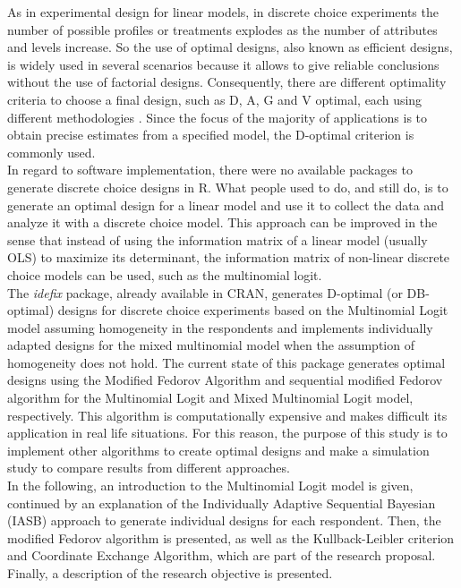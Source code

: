 \documentclass[12pt,a4paper,oneside]{article}
\begin{document}
\noindent As in experimental design for linear models, in discrete choice experiments the number of possible profiles or treatments explodes as the number of attributes and levels increase. So the use of optimal designs, also known as efficient designs, is widely used in several scenarios because it allows to give reliable conclusions without the use of factorial designs. Consequently, there are different optimality criteria to choose a final design, such as D, A, G and V optimal, each using different methodologies \citep[see][]{Kessels2006}. Since the focus of the majority of applications is to obtain precise estimates from a specified model, the D-optimal criterion is commonly used.\\

\noindent In regard to software implementation, there were no available packages to generate discrete choice designs in R. What people used to do, and still do, is to generate an optimal design for a linear model and use it to collect the data and analyze it with a discrete choice model. This approach can be improved in the sense that instead of using the information matrix of a linear model (usually OLS) to maximize its determinant, the information matrix of non-linear discrete choice models can be used, such as the multinomial logit. \\

\noindent The \textit{idefix} package, already available in CRAN, generates D-optimal (or DB-optimal) designs for discrete choice experiments based on the Multinomial Logit model assuming homogeneity in the respondents and implements individually adapted designs for the mixed multinomial model when the assumption of homogeneity does not hold. The current state of this package generates optimal designs using the Modified Fedorov Algorithm and sequential modified Fedorov algorithm for the Multinomial Logit and Mixed Multinomial Logit model, respectively. This algorithm is computationally expensive and makes difficult its application in real life situations. For this reason, the purpose of this study is to implement other algorithms to create optimal designs and make a simulation study to compare results from different approaches. \\

\noindent In the following, an introduction to the Multinomial Logit model is given, continued by an explanation of the Individually Adaptive Sequential Bayesian (IASB) approach to generate individual designs for each respondent. Then, the modified Fedorov algorithm is presented, as well as the Kullback-Leibler criterion and Coordinate Exchange Algorithm, which are part of the research proposal. Finally, a description of the research objective is presented.
\end{document}
